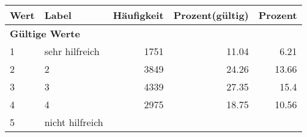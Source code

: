      \begin{longtable}{lXrrr}
     \toprule
     \textbf{Wert} & \textbf{Label} & \textbf{Häufigkeit} & \textbf{Prozent(gültig)} & \textbf{Prozent} \\
     \endhead
     \midrule
     \multicolumn{5}{l}{\textbf{Gültige Werte}}\\

     1 &
     \multicolumn{1}{X}{ sehr hilfreich   } &


       \num{1751} &
       \num[round-mode=places,round-precision=2]{11.04} &
         \num[round-mode=places,round-precision=2]{6.21} \\

     2 &
     \multicolumn{1}{X}{ 2   } &


       \num{3849} &
       \num[round-mode=places,round-precision=2]{24.26} &
         \num[round-mode=places,round-precision=2]{13.66} \\

     3 &
     \multicolumn{1}{X}{ 3   } &


       \num{4339} &
       \num[round-mode=places,round-precision=2]{27.35} &
         \num[round-mode=places,round-precision=2]{15.4} \\

     4 &
     \multicolumn{1}{X}{ 4   } &


       \num{2975} &
       \num[round-mode=places,round-precision=2]{18.75} &
         \num[round-mode=places,round-precision=2]{10.56} \\

     5 &
     \multicolumn{1}{X}{ nicht hilfreich   } &



\end{longtable}
